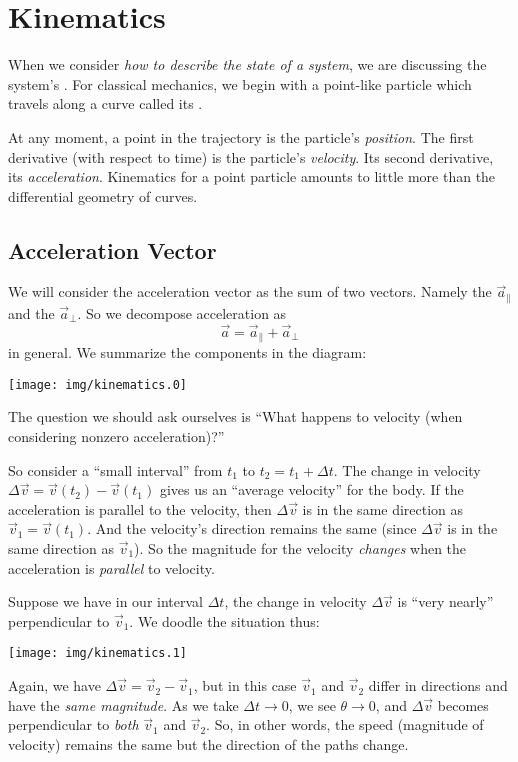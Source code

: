 \section{Kinematics}

When we consider \emph{how to describe the state of a system},
we are discussing the system's . For classical
mechanics, we begin with a point-like particle which travels along a
curve called its . 

At any moment, a point in the trajectory is the particle's
\emph{position}. The first derivative (with respect to time) is the
particle's \emph{velocity}. Its second derivative, its
\emph{acceleration}. Kinematics for a point particle amounts to little
more than the differential geometry of curves.

\subsection{Acceleration Vector}

\M We will consider the acceleration vector as the sum of two
vectors. Namely the  $\vec{a}_{\parallel}$
and the  $\vec{a}_{\perp}$. So we
decompose acceleration as
\begin{equation}
\vec{a} = \vec{a}_{\parallel}+\vec{a}_{\perp}
\end{equation}
in general. We summarize the components in the diagram:
\begin{center}
\texttt{[image: img/kinematics.0]}
\end{center}
\noindent%
The question we should ask ourselves is ``What happens to velocity (when
considering nonzero acceleration)?''

So consider a ``small interval'' from $t_{1}$ to $t_{2}=t_{1}+\Delta t$. 
The change in velocity $\Delta\vec{v}=\vec{v}(t_{2})-\vec{v}(t_{1})$
gives us an ``average velocity'' for the body. If the acceleration is
parallel to the velocity, then $\Delta\vec{v}$ is in the same direction
as $\vec{v}_{1}=\vec{v}(t_{1})$. And the velocity's direction remains the same
(since $\Delta\vec{v}$ is in the same direction as $\vec{v}_{1}$). So
the magnitude for the velocity \emph{changes} when the acceleration is
\emph{parallel} to velocity.

Suppose we have in our interval $\Delta t$, the change in velocity
$\Delta\vec{v}$ is ``very nearly'' perpendicular to $\vec{v}_{1}$. We
doodle the situation thus:
\begin{center}
\texttt{[image: img/kinematics.1]}
\end{center}
\noindent%
Again, we have $\Delta\vec{v}=\vec{v}_{2}-\vec{v}_{1}$, but in this case
$\vec{v}_{1}$ and $\vec{v}_{2}$ differ in directions and have the
\emph{same magnitude}. As we take $\Delta t\to0$, we see $\theta\to0$,
and $\Delta\vec{v}$ becomes perpendicular to \emph{both} $\vec{v}_1$ and
$\vec{v}_2$. So, in other words, the speed (magnitude of velocity)
remains the same but the direction of the paths change.

